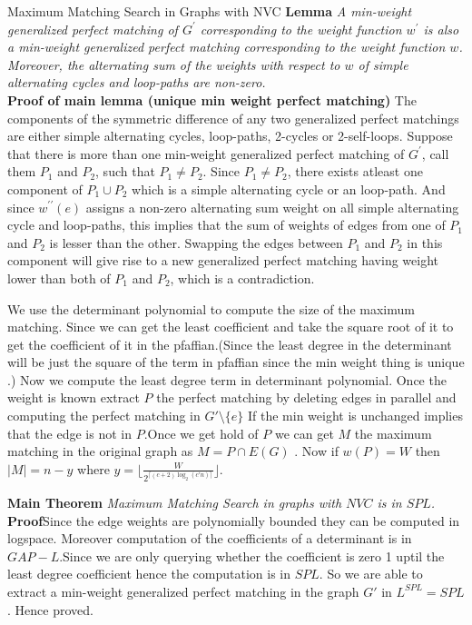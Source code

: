 \documentclass{beamer}
\begin{document}
\begin{frame}[allowframebreaks]{Maximum Matching Search in Graphs with NVC}
\textbf{Lemma} \textit{A min-weight generalized perfect matching of $G^{\prime}$ corresponding to the weight function $w^{\prime}$ is also a min-weight generalized perfect matching corresponding to the weight function $w$. Moreover, the alternating sum of the weights with respect to $w$ of simple alternating cycles and loop-paths are non-zero.}
\\
 \textbf{Proof of main lemma (unique min weight perfect matching)} The components of the symmetric difference of any two generalized perfect matchings are either simple alternating cycles, loop-paths, 2-cycles or 2-self-loops. Suppose that there is more than one min-weight generalized perfect matching of $G^{\prime}$, call them $P_1$ and $P_2$, such that $P_1 \neq P_2$. Since $P_1 \neq P_2$, there exists atleast one component of $P_1 \cup P_2$ which is a simple alternating cycle or an loop-path. And since $w^{\prime \prime}(e)$ assigns a non-zero alternating sum weight on all simple alternating cycle and loop-paths, this implies that the sum of weights of edges from one of $P_1$ and $P_2$ is lesser than the other. Swapping the edges between $P_1$ and $P_2$ in this component will give rise to a new generalized perfect matching having weight lower than both of $P_1$ and $P_2$, which is a contradiction.

We use the determinant polynomial to compute the size of the maximum matching.
Since we can get the least coefficient and take the square root of it to get the coefficient of it in the pfaffian.(Since the least degree in the determinant will be just  the square of the term in pfaffian since the min weight thing is unique .)
Now we compute the least degree term in determinant polynomial. Once the weight is known extract $P$ the perfect matching by deleting edges in parallel and computing the perfect matching in $G'\setminus \{e\}$ If the min weight is unchanged implies that the edge is not in $P$.Once we get hold of $P$ we can get $M$ the maximum matching in the original graph as $M=P\cap E(G)$ . Now if $w(P)=W$ then $|M|=n-y$ where $y=\lfloor \frac{W}{2^{\lceil(c+2)\log_2(c'n)\rceil}}\rfloor$.

\break
\textbf{Main Theorem} \textit{Maximum Matching Search in graphs with $NVC$ is in $SPL$.}\\
\textbf{Proof}Since the edge weights are polynomially bounded they can be computed in logspace. Moreover computation of the coefficients of a determinant is in $GAP-L$.Since we are only querying whether the coefficient is zero 1 uptil the least degree coefficient hence the computation is in $SPL$.
So we are able to extract a min-weight generalized perfect matching in the graph $G'$ in $L^{SPL}=SPL$. Hence proved.
\end{frame}
\end{document}
